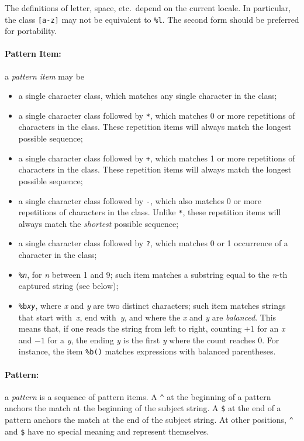 \documentclass[11pt,twoside]{article}
\newcommand{\M}[1]{{\rm\emph{#1}}}
\newcommand{\T}[1]{{\tt #1}}
\newcommand{\Math}[1]{$#1$}
\newcommand{\Def}[1]{\emph{#1}\index{#1}}
\begin{document}
The definitions of letter, space, etc.\ depend on the current locale.
In particular, the class \verb|[a-z]| may not be equivalent to \verb|%l|.
The second form should be preferred for portability.

\paragraph{Pattern Item:}
a \Def{pattern item} may be
\begin{itemize}
\item
a single character class,
which matches any single character in the class;
\item
a single character class followed by \verb|*|,
which matches 0 or more repetitions of characters in the class.
These repetition items will always match the longest possible sequence;
\item
a single character class followed by \verb|+|,
which matches 1 or more repetitions of characters in the class.
These repetition items will always match the longest possible sequence;
\item
a single character class followed by \verb|-|,
which also matches 0 or more repetitions of characters in the class.
Unlike \verb|*|,
these repetition items will always match the \emph{shortest} possible sequence;
\item
a single character class followed by \verb|?|,
which matches 0 or 1 occurrence of a character in the class;
\item
\T{\%\M{n}}, for \M{n} between 1 and 9;
such item matches a substring equal to the \M{n}-th captured string
(see below);
\item
\T{\%b\M{xy}}, where \M{x} and \M{y} are two distinct characters;
such item matches strings that start with~\M{x}, end with~\M{y},
and where the \M{x} and \M{y} are \emph{balanced}.
This means that, if one reads the string from left to right,
counting \Math{+1} for an \M{x} and \Math{-1} for a \M{y},
the ending \M{y} is the first \M{y} where the count reaches 0.
For instance, the item \verb|%b()| matches expressions with
balanced parentheses.
\end{itemize}

\paragraph{Pattern:}
a \Def{pattern} is a sequence of pattern items.
A \verb|^| at the beginning of a pattern anchors the match at the
beginning of the subject string.
A \verb|$| at the end of a pattern anchors the match at the
end of the subject string.
At other positions,
\verb|^| and \verb|$| have no special meaning and represent themselves.
\end{document}
